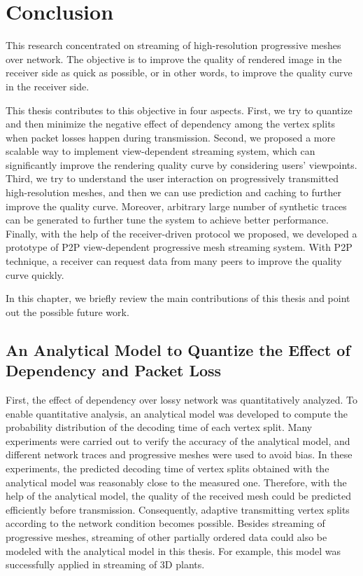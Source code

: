 \chapter{Conclusion}
\label{c:conclusion}
This research concentrated on streaming of high-resolution progressive meshes over network. 
The objective is to improve the quality of rendered image in the receiver side
as quick as possible, or in other words, to improve the quality curve in the receiver
side. 

This thesis contributes to this objective in four aspects.
First, we try to quantize and then minimize the negative effect of dependency
among the vertex splits when packet losses happen during transmission.
Second, we proposed a more scalable way to implement view-dependent streaming
system, which can significantly improve the rendering quality curve by considering 
users' viewpoints. 
Third, we try to understand the user interaction on progressively transmitted 
high-resolution meshes, and then we can use prediction and caching to further 
improve the quality curve. Moreover, arbitrary large number of synthetic traces 
can be generated to further tune the system to achieve better performance.
Finally, with the help of the receiver-driven protocol we proposed, we developed 
a prototype of P2P view-dependent progressive mesh streaming system. With P2P
technique, a receiver can request data from many peers to improve the quality curve 
quickly.

In this chapter, we briefly review the main contributions of this thesis and point
out the possible future work.

\section{An Analytical Model to Quantize the Effect of Dependency and Packet Loss}
First, the effect of dependency over lossy network was quantitatively analyzed. 
To enable quantitative analysis, an analytical model was developed to compute 
the probability distribution of the decoding time of each vertex split. 
Many experiments were carried out to verify the accuracy of the analytical model, 
and different network traces and progressive meshes were used to avoid bias. 
In these experiments, the predicted decoding time of vertex splits obtained 
with the analytical model was reasonably close to the measured one. 
Therefore, with the help of the analytical model, 
the quality of the received mesh could be predicted efficiently before transmission.
Consequently, adaptive transmitting vertex splits according to the network condition
becomes possible. Besides streaming of progressive meshes, 
streaming of other partially ordered data could also be modeled
with the analytical model in this thesis. 
For example, this model was successfully applied in streaming of 3D plants.

